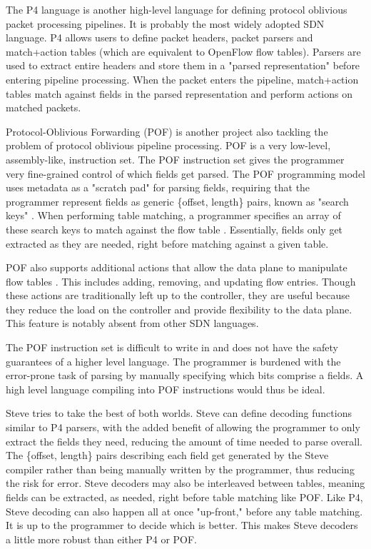 The P4 language \cite{p4_spec, p4_spec2} is another high-level language for
defining protocol oblivious packet processing pipelines. It is probably the
most widely adopted SDN language. P4 allows users to define packet headers,
packet parsers and
match+action tables (which are equivalent to OpenFlow flow tables). Parsers are
used to extract entire headers and store them in a "parsed representation"
before entering pipeline processing. When the packet enters the pipeline,
match+action tables match against fields in the parsed representation and
perform actions on matched packets. 

Protocol-Oblivious Forwarding (POF) \cite{pof_fis, pof, pof_impl} is another
project also tackling the problem of protocol oblivious pipeline processing. POF
is a very low-level, assembly-like, instruction set. The POF instruction
set gives the programmer very fine-grained control of which fields get parsed.
The POF programming model uses metadata as a "scratch pad" for parsing fields,
requiring that the
programmer represent fields as generic \{offset, length\} pairs, known as
"search keys" \cite{pof}. When performing table matching, a programmer specifies
an array of these search keys to match against the flow table \cite{pof_impl}.
Essentially, fields only get extracted as they are needed, right before matching
against a given table.

POF also supports additional actions that allow the data plane to manipulate
flow tables \cite{pof}. This includes adding, removing, and updating flow
entries. Though these actions are traditionally left up to the controller, they
are useful because they reduce the load on the controller and provide
flexibility to the data plane. This feature is notably absent from other SDN
languages.

The POF instruction set is difficult to write in and does not have the safety
guarantees of a higher level language. The programmer is burdened with the
error-prone task of parsing by manually specifying which bits comprise a fields. 
A high level language compiling into POF instructions would thus be ideal.

Steve tries to take the best of both worlds. Steve can define decoding functions
similar to P4 parsers, with the added benefit of allowing the programmer to only
extract the fields they need, reducing the amount of time needed to parse
overall. The \{offset, length\} pairs describing each field get generated by the
Steve compiler rather than being manually written by the programmer, thus
reducing
the risk for error. Steve decoders may also be interleaved between tables,
meaning fields can be extracted, as needed, right before table matching like
POF. Like P4,
Steve decoding can also happen all at once "up-front," before any table
matching. 
It is up to the programmer to decide which is better. This makes Steve
decoders a little more robust than either P4 or POF. 

